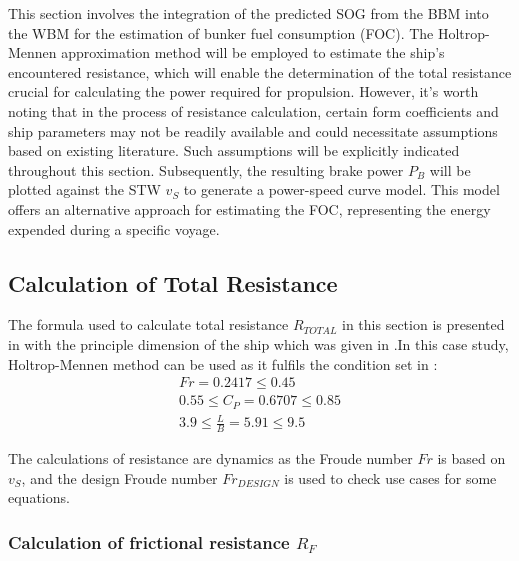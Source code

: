 This section involves the integration of the predicted SOG from the BBM into the WBM for the estimation of bunker fuel consumption (FOC). The Holtrop-Mennen approximation method will be employed to estimate the ship's encountered resistance, which will enable the determination of the total resistance crucial for calculating the power required for propulsion. However, it's worth noting that in the process of resistance calculation, certain form coefficients and ship parameters may not be readily available and could necessitate assumptions based on existing literature. Such assumptions will be explicitly indicated throughout this section. Subsequently, the resulting brake power $P_B$ will be plotted against the STW $v_S$ to generate a power-speed curve model. This model offers an alternative approach for estimating the FOC, representing the energy expended during a specific voyage.

\subsection{Calculation of Total Resistance}\label{sec:Rtot_calc_method}

The formula used to calculate total resistance $R_{TOTAL}$ in this section is presented in  with the principle dimension of the ship which was given in .In this case study, Holtrop-Mennen method can be used as it fulfils the condition set in :
\begin{equation}
    \label{eqn:holtrop_cond_fulfill}
    \begin{gathered}
        Fr = 0.2417  \leqslant 0.45 \\
        0.55 \leqslant C_P = 0.6707 \leqslant 0.85 \\
        3.9 \leqslant \frac{L}{B} = 5.91 \leqslant 9.5
    \end{gathered}
\end{equation}

The calculations of resistance are dynamics as the Froude number $Fr$ is based on $v_S$, and the design Froude number $Fr_{DESIGN}$ is used to check use cases for some equations.

\subsubsection*{Calculation of frictional resistance $R_F$}

